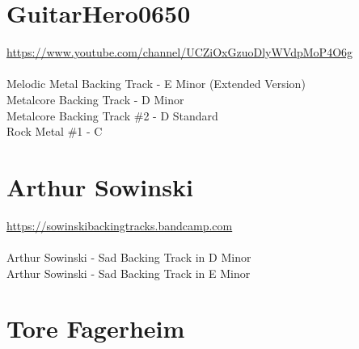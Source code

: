 \section{GuitarHero0650}

\url*{https://www.youtube.com/channel/UCZiOxGzuoDlyWVdpMoP4O6g}\\
\ \\
Melodic Metal Backing Track - E Minor (Extended Version)\\
Metalcore Backing Track - D Minor\\
Metalcore Backing Track \#2 - D Standard\\
Rock Metal \#1 - C\\

\section{Arthur Sowinski}

\url*{https://sowinskibackingtracks.bandcamp.com}\\
\ \\
Arthur Sowinski - Sad Backing Track in D Minor\\
Arthur Sowinski - Sad Backing Track in E Minor\\

\section{Tore Fagerheim}

